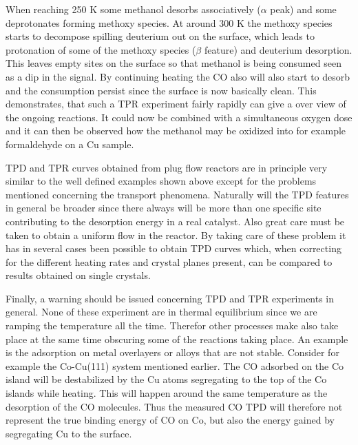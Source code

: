 \vspace{1cm}




 When reaching 250 K some methanol desorbs associatively ($\alpha$ peak) and some deprotonates forming methoxy species. At around 300 K the methoxy species starts to decompose spilling deuterium out on the surface, which  leads to protonation of some of the methoxy species ($\beta$ feature) and deuterium desorption. This leaves empty sites on the surface so that methanol is being consumed seen as a dip in the signal. By continuing heating the CO also will also start to desorb and the consumption persist since the surface is now basically clean. This demonstrates, that such a TPR experiment fairly rapidly can give a over view of the ongoing reactions. It could now be combined with a simultaneous oxygen dose and it can then be observed how the methanol may be oxidized into for example formaldehyde on a Cu sample.


TPD and TPR curves obtained from plug flow reactors are in principle very similar to the well defined examples shown above except for the problems mentioned concerning the transport phenomena. Naturally will  the TPD features in general be broader since there  always will be more than one specific site contributing to the desorption energy in a real catalyst.  Also great care must  be taken to obtain a uniform flow  in the reactor.  By taking care of these problem  it has in several cases been possible to obtain TPD curves which, when correcting for the different heating rates and crystal planes present, can be compared to  results obtained on single crystals.


Finally, a warning should be issued concerning TPD and TPR experiments in general. None of these experiment are in thermal equilibrium since we are ramping the temperature all the time. Therefor other processes make also take place at the same time obscuring some of the reactions taking place. An example is the adsorption on metal overlayers or alloys that are not stable. Consider for example the Co-Cu(111) system mentioned earlier. The CO adsorbed on the Co island will be destabilized by the Cu atoms segregating to the top of the Co islands while heating. This will  happen around the same temperature  as the desorption of the  CO molecules. Thus the  measured CO TPD will therefore not represent the true binding energy of CO on Co, but also the energy gained by segregating Cu to the surface. 
